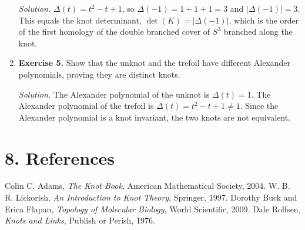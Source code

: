 \begin{enumerate}[leftmargin=*,itemsep=0.9em]
\emph{Solution.} $\Delta(t)=t^2-t+1$, so $\Delta(-1)=1+1+1=3$ and $|\Delta(-1)|=3$. This equals the knot determinant, $\det(K)=|\Delta(-1)|$, which is the order of the first homology of the double branched cover of $S^3$ branched along the knot.

\item \textbf{Exercise 5.} Show that the unknot and the trefoil have different Alexander polynomials, proving they are distinct knots.

\emph{Solution.} The Alexander polynomial of the unknot is $\Delta(t)=1$. The Alexander polynomial of the trefoil is $\Delta(t)=t^2-t+1\neq 1$. Since the Alexander polynomial is a knot invariant, the two knots are not equivalent.

\end{enumerate}
\section*{8. References}

\begin{thebibliography}{9}
 Colin C. Adams, \emph{The Knot Book}, American Mathematical Society, 2004.
 W. B. R. Lickorish, \emph{An Introduction to Knot Theory}, Springer, 1997.
 Dorothy Buck and Erica Flapan, \emph{Topology of Molecular Biology}, World Scientific, 2009.
 Dale Rolfsen, \emph{Knots and Links}, Publish or Perish, 1976.
\end{thebibliography}